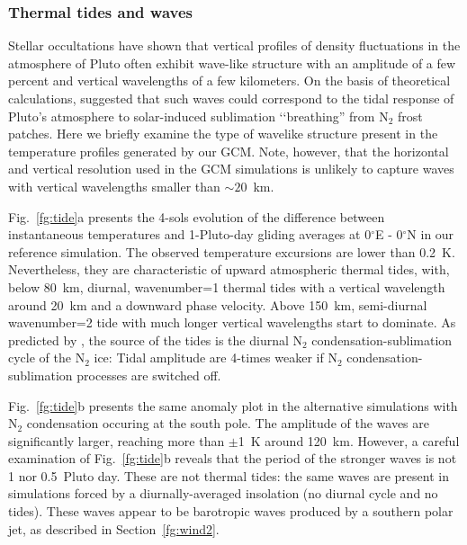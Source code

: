 \subsubsection{Thermal tides and waves}


Stellar occultations have shown that vertical profiles of 
density fluctuations in the atmosphere of Pluto
often exhibit wave-like structure \citep[e.g.][]{Sica:03,Pers:08} with an amplitude of a few
percent and vertical wavelengths of a few kilometers.
On the basis of theoretical calculations, \cite{Toig:10} suggested that
such waves could correspond to the tidal response of Pluto’s atmosphere 
to solar-induced sublimation ‘‘breathing” from N$_2$ frost patches. 
Here we briefly examine 
the type of wavelike structure present in the temperature profiles generated by our 
GCM. Note, however, that the horizontal and vertical resolution used in the GCM
simulations is unlikely to capture waves with vertical wavelengths smaller than
$\sim20$~km. 

Fig.~\ref{fg:tide}a presents the 4-sols evolution of the difference between 
instantaneous temperatures and 1-Pluto-day gliding averages at
0$^\circ$E - 0$^\circ$N in our reference simulation. The observed temperature excursions 
are lower than 0.2~K.  Nevertheless, they are characteristic of upward atmospheric thermal tides, 
with, below 80~km, diurnal, wavenumber=1 thermal tides with a vertical wavelength around
20~km and a downward phase velocity. Above 150~km, semi-diurnal wavenumber=2 tide with much
longer vertical wavelengths start to dominate. As predicted by \cite{Toig:10}, the source of
the tides is the diurnal N$_2$ condensation-sublimation cycle of the N$_2$ ice: 
Tidal amplitude are 4-times weaker if N$_2$ 
condensation-sublimation processes are switched off. 

Fig.~\ref{fg:tide}b presents the same anomaly plot in the alternative simulations with N$_2$
condensation occuring at the south pole. The amplitude of the waves are significantly larger,
reaching more than $\pm$1~K around 120~km. However, a careful examination of
Fig.~\ref{fg:tide}b reveals that the period of the stronger waves is not 1 nor 0.5~Pluto day.
These are not thermal tides: the same waves are present in simulations forced by a
diurnally-averaged insolation (no diurnal cycle and no tides). These waves appear to be
barotropic waves produced by a southern polar jet, as described in
Section~\ref{fg:wind2}.



